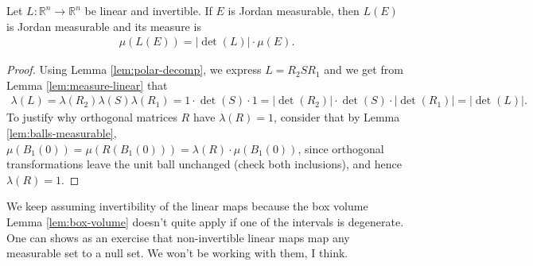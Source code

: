 \begin{theorem}\label{thm:jordan-linear-maps}
	Let $L: \mathbb{R}^{n} \to \mathbb{R}^{n}$ be linear and invertible. If $E$ is Jordan measurable, then $L(E)$ is Jordan measurable and its measure is
	\begin{align*}
		\mu(L(E)) = \left| \det (L) \right| \cdot \mu(E).
	\end{align*}
\end{theorem}
\begin{proof}
	Using Lemma \ref{lem:polar-decomp}, we express $L = R_{2} S R_{1}$ and we get from Lemma \ref{lem:measure-linear} that
	\begin{align*}
		\lambda(L) = \lambda(R_{2}) \lambda(S) \lambda(R_{1}) = 1 \cdot  \det (S) \cdot 1 = \left| \det (R_{2}) \right| \cdot \det (S) \cdot \left| \det (R_{1}) \right| = \left| \det (L) \right|.
	\end{align*}
	To justify why orthogonal matrices $R$ have $\lambda(R) = 1$, consider that by Lemma \ref{lem:balls-measurable}, $\mu(B_{1}(0)) = \mu(R(B_{1}(0))) = \lambda(R) \cdot \mu(B_{1}(0))$, since orthogonal transformations leave the unit ball unchanged (check both inclusions), and hence $\lambda(R) = 1$.
\end{proof}


\begin{remark}[Invertibility]
    We keep assuming invertibility of the linear maps because the box volume Lemma \ref{lem:box-volume} doesn't quite apply if one of the intervals is degenerate. One can shows as an exercise that non-invertible linear maps map any measurable set to a null set. We won't be working with them, I think.
\end{remark}
